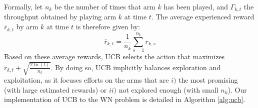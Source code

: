 \documentclass[preprint,12pt]{elsarticle}
\begin{document}
Formally, let $n_k$ be the number of times that arm $k$ has been played, and $\Gamma_{k,t}$ the throughput obtained by playing arm $k$ at time $t$. The average experienced reward $\overline{r}_{k,t}$ by arm $k$ at time $t$ is therefore given by:
\begin{equation}
\label{eq:ucb}
\overline{r}_{k,t} = \frac{1}{n_k} \sum_{s=1}^{n_k} r_{k,s}
\nonumber
\end{equation}	
Based on these average rewards, UCB selects the action that maximizes $\overline{r}_{k,t} + \sqrt{\frac{2 \ln(t)}{n_k}}$. By doing so, UCB implicitly balances exploration and exploitation, as it focuses efforts on the arms that are $i)$ the most promising (with large estimated rewards) or $ii)$ not explored enough (with small $n_k$). Our implementation of UCB to the WN problem is detailed in Algorithm \ref{alg:ucb}.	
\end{document}
